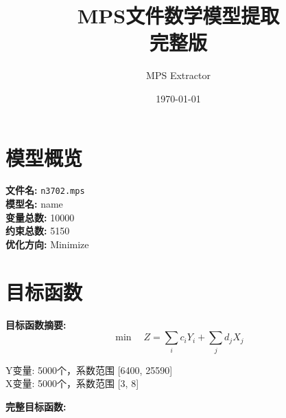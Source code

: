\documentclass[a4paper,10pt]{article}
\title{MPS文件数学模型提取\\{\large 完整版}}
\author{MPS Extractor}
\date{\today}
\begin{document}
\maketitle
\tableofcontents
\newpage

\section{模型概览}

\textbf{文件名:} \texttt{n3702.mps} \\
\textbf{模型名:} name \\
\textbf{变量总数:} 10000 \\
\textbf{约束总数:} 5150 \\
\textbf{优化方向:} Minimize \\

\section{目标函数}

\textbf{目标函数摘要:}
\begin{equation}
\min \quad Z = \sum_{i} c_i Y_i + \sum_{j} d_j X_j
\end{equation}

Y变量: 5000个，系数范围 [6400, 25590] \\
X变量: 5000个，系数范围 [3, 8]

\textbf{完整目标函数:}
\end{document}
